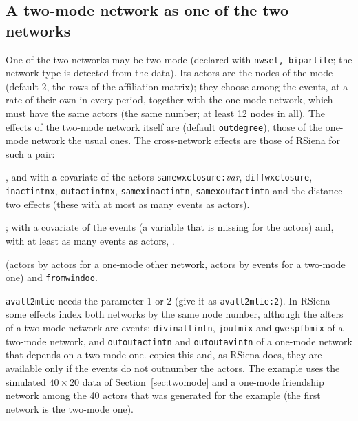 \subsection{A two-mode network as one of the two networks}\label{sec:mn-twomode}
One of the two networks may be two-mode (declared with \texttt{nwset, bipartite}; the network type is detected from the data). Its actors are the nodes of the mode  (default 2, the rows of the affiliation matrix); they choose among the events, at a rate of their own in every period, together with the one-mode network, which must have the same actors (the same number; at least 12 nodes in all). The effects of the two-mode network itself are  (default \texttt{outdegree}), those of the one-mode network the usual ones. The cross-network effects are those of RSiena for such a pair:
\begin{description}[leftmargin=0pt,labelindent=0pt]
\item[Two-mode network depending on the one-mode network] , and with a covariate of the actors \texttt{samewxclosure:}\emph{var}, \texttt{diffwxclosure}, \texttt{inactintnx}, \texttt{outactintnx}, \texttt{samexinactintn}, \texttt{samexoutactintn} and the distance-two effects  (these with at most as many events as actors).
\item[One-mode network depending on the two-mode network] ; with a covariate of the events (a variable that is missing for the actors)  and, with at least as many events as actors, .
\item[With a dyadic covariate]  (actors by actors for a one-mode other network, actors by events for a two-mode one) and \texttt{fromwindoo}.
\end{description}
\texttt{avalt2mtie} needs the parameter 1 or 2 (give it as \texttt{avalt2mtie:2}). In RSiena some effects index both networks by the same node number, although the alters of a two-mode network are events: \texttt{divinaltintn}, \texttt{joutmix} and \texttt{gwespfbmix} of a two-mode network, and \texttt{outoutactintn} and \texttt{outoutavintn} of a one-mode network that depends on a two-mode one. \nwsaom{} copies this and, as RSiena does, they are available only if the events do not outnumber the actors. The example uses the simulated $40\times20$ data of Section~\ref{sec:twomode} and a one-mode friendship network among the 40 actors that was generated for the example (the first network is the two-mode one).
